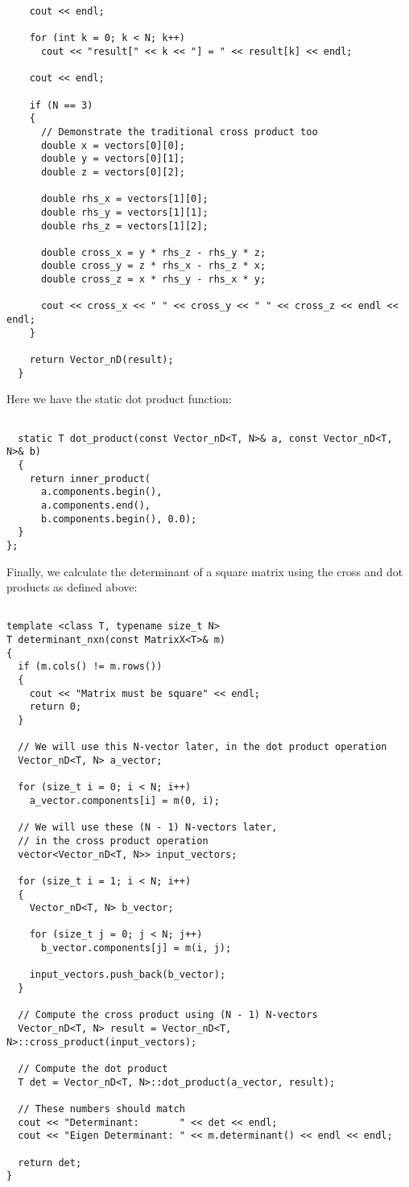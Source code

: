 \documentclass[12pt]{article}
\begin{document}
\begin{lstlisting}
    cout << endl;

    for (int k = 0; k < N; k++)
      cout << "result[" << k << "] = " << result[k] << endl;

    cout << endl;

    if (N == 3)
    {
      // Demonstrate the traditional cross product too
      double x = vectors[0][0];
      double y = vectors[0][1];
      double z = vectors[0][2];

      double rhs_x = vectors[1][0];
      double rhs_y = vectors[1][1];
      double rhs_z = vectors[1][2];

      double cross_x = y * rhs_z - rhs_y * z;
      double cross_y = z * rhs_x - rhs_z * x;
      double cross_z = x * rhs_y - rhs_x * y;

      cout << cross_x << " " << cross_y << " " << cross_z << endl << endl;
    }

    return Vector_nD(result);
  }

\end{lstlisting}

Here we have the static dot product function:
\begin{lstlisting}

  static T dot_product(const Vector_nD<T, N>& a, const Vector_nD<T, N>& b)
  {
    return inner_product(
      a.components.begin(), 
      a.components.end(), 
      b.components.begin(), 0.0);
  }
};

\end{lstlisting}

Finally, we calculate the determinant of a square matrix using the cross and dot products as defined above:
\begin{lstlisting}

template <class T, typename size_t N>
T determinant_nxn(const MatrixX<T>& m)
{
  if (m.cols() != m.rows())
  {
    cout << "Matrix must be square" << endl;
    return 0;
  }

  // We will use this N-vector later, in the dot product operation
  Vector_nD<T, N> a_vector;

  for (size_t i = 0; i < N; i++)
    a_vector.components[i] = m(0, i);

  // We will use these (N - 1) N-vectors later, 
  // in the cross product operation
  vector<Vector_nD<T, N>> input_vectors;

  for (size_t i = 1; i < N; i++)
  {
    Vector_nD<T, N> b_vector;

    for (size_t j = 0; j < N; j++)
      b_vector.components[j] = m(i, j);

    input_vectors.push_back(b_vector);
  }

  // Compute the cross product using (N - 1) N-vectors
  Vector_nD<T, N> result = Vector_nD<T, N>::cross_product(input_vectors);

  // Compute the dot product
  T det = Vector_nD<T, N>::dot_product(a_vector, result);

  // These numbers should match
  cout << "Determinant:       " << det << endl;
  cout << "Eigen Determinant: " << m.determinant() << endl << endl;

  return det;
}

\end{lstlisting}
\end{document}
